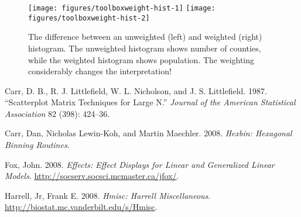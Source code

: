 \begin{Shaded}
\begin{Highlighting}[]
  \NormalTok{)}
  
   \NormalTok{) +}\StringTok{ }\NormalTok{(}\NormalTok{)}
\end{Highlighting}
\end{Shaded}

\begin{figure}
\texttt{[image: figures/toolboxweight-hist-1]} \texttt{[image: figures/toolboxweight-hist-2]} \caption{The difference between an unweighted (left) and weighted (right) histogram. The unweighted histogram shows number of counties, while the weighted histogram shows population. The weighting considerably changes the interpretation!\label{fig:weight-hist}}
\end{figure}

Carr, D. B., R. J. Littlefield, W. L. Nicholson, and J. S. Littlefield.
1987. ``Scatterplot Matrix Techniques for Large N.'' \emph{Journal of
the American Statistical Association} 82 (398): 424--36.

Carr, Dan, Nicholas Lewin-Koh, and Martin Maechler. 2008. \emph{Hexbin:
Hexagonal Binning Routines}.

Fox, John. 2008. \emph{Effects: Effect Displays for Linear and
Generalized Linear Models}.
\url{http://socserv.socsci.mcmaster.ca/jfox/}.

Harrell, Jr, Frank E. 2008. \emph{Hmisc: Harrell Miscellaneous}.
\url{http://biostat.mc.vanderbilt.edu/s/Hmisc}.
